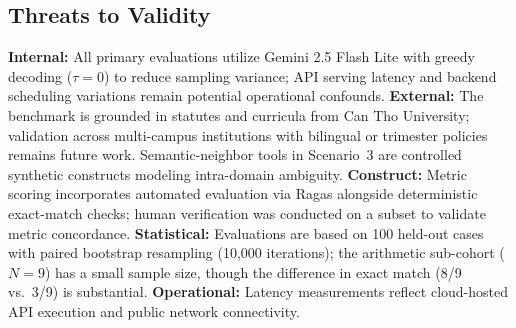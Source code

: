 \subsection{Threats to Validity}
\label{sec:limitations}
\textbf{Internal:} All primary evaluations utilize Gemini 2.5 Flash Lite with greedy decoding ($\tau{=}0$) to reduce sampling variance; API serving latency and backend scheduling variations remain potential operational confounds. \textbf{External:} The benchmark is grounded in statutes and curricula from Can Tho University; validation across multi-campus institutions with bilingual or trimester policies remains future work. Semantic-neighbor tools in Scenario~3 are controlled synthetic constructs modeling intra-domain ambiguity. \textbf{Construct:} Metric scoring incorporates automated evaluation via Ragas alongside deterministic exact-match checks; human verification was conducted on a subset to validate metric concordance. \textbf{Statistical:} Evaluations are based on 100 held-out cases with paired bootstrap resampling (10,000 iterations); the arithmetic sub-cohort ($N{=}9$) has a small sample size, though the difference in exact match (8/9 vs.\ 3/9) is substantial. \textbf{Operational:} Latency measurements reflect cloud-hosted API execution and public network connectivity.
